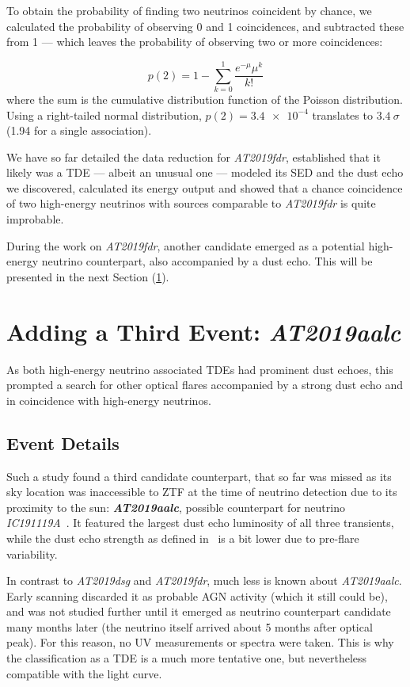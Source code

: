 To obtain the probability of finding two neutrinos coincident by chance, we calculated the probability of observing 0 and 1 coincidences, and subtracted these from 1 --- which leaves the probability of observing two or more coincidences:

\begin{equation}
    p(2) = 1 - \sum_{k=0}^1 \frac{e^{-\mu}\mu^k}{k!}
\end{equation}
where the sum is the cumulative distribution function of the Poisson distribution. Using a right-tailed normal distribution, $p(2)=\num{3.4e-4}$ translates to $\SI{3.4}{\sigma}$ (\SI{1.94}{\sigma} for a single association).

We have so far detailed the data reduction for \emph{AT2019fdr}, established that it likely was a TDE --- albeit an unusual one --- modeled its SED and the dust echo we discovered, calculated its energy output and showed that a chance coincidence of two high-energy neutrinos with sources comparable to \emph{AT2019fdr} is quite improbable.

During the work on \textit{AT2019fdr}, another candidate emerged as a potential high-energy neutrino counterpart, also accompanied by a dust echo. This will be presented in the next Section (\ref{at2019aalc}).

\section{Adding a Third Event: \textit{AT2019aalc}}\label{at2019aalc}
As both high-energy neutrino associated TDEs had prominent dust echoes, this prompted a search for other optical flares accompanied by a strong dust echo and in coincidence with high-energy neutrinos.

\subsection{Event Details}
Such a study found a third candidate counterpart, that so far was missed as its sky location was inaccessible to ZTF at the time of neutrino detection due to its proximity to the sun: \textbf{\textit{AT2019aalc}}, possible counterpart for neutrino \textit{IC191119A}~\cite{Velzen2021}. It featured the largest dust echo luminosity of all three transients, while the dust echo strength as defined in~\cite{Velzen2021} is a bit lower due to pre-flare variability.

In contrast to \textit{AT2019dsg} and \textit{AT2019fdr}, much less is known about \textit{AT2019aalc}. Early scanning discarded it as probable AGN activity (which it still could be), and was not studied further until it emerged as neutrino counterpart candidate many months later (the neutrino itself arrived about 5 months after optical peak). For this reason, no UV measurements or spectra were taken. This is why the classification as a TDE is a much more tentative one, but nevertheless compatible with the light curve.

